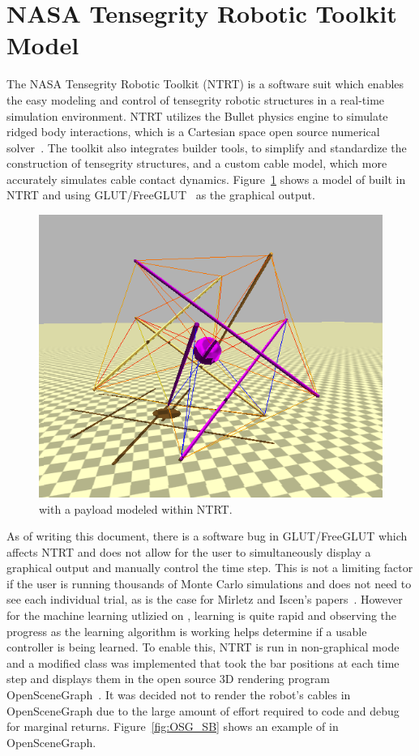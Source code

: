 \section{NASA Tensegrity Robotic Toolkit Model}
The NASA Tensegrity Robotic Toolkit (NTRT) is a software suit which enables the easy modeling and control of tensegrity robotic structures in a real-time simulation environment.
NTRT utilizes the Bullet physics engine to simulate ridged body interactions, which is a Cartesian space open source numerical solver~\cite{coumans2012bullet}.
The toolkit also integrates builder tools, to simplify and standardize the construction of tensegrity structures, and a custom cable model, which more accurately simulates cable contact dynamics.
Figure~\ref{fig:NTRT_SB} shows a model of \SB{} built in NTRT and using GLUT/FreeGLUT~\cite{baker2008freeglut} as the graphical output.

\begin{figure}[th]
      \centering
      \includegraphics[width=0.8\columnwidth]{tex/img/1.png}
      \caption{\SB{} with a payload modeled within NTRT.}
      \label{fig:NTRT_SB}
\end{figure}

As of writing this document, there is a software bug in GLUT/FreeGLUT which affects NTRT and does not allow for the user to simultaneously display a graphical output and manually control the time step.
This is not a limiting factor if the user is running thousands of Monte Carlo simulations and does not need to see each individual trial, as is the case for Mirletz and Iscen's papers~\cite{mirletz2015goal, iscen2014flop}.
However for the machine learning utlizied on \SB{}, learning is quite rapid and observing the progress as the learning algorithm is working helps determine if a usable controller is being learned.
To enable this, NTRT is run in non-graphical mode and a modified class was implemented that took the bar positions at each time step and displays them in the open source 3D rendering program OpenSceneGraph~\cite{osfield2004open}.
It was decided not to render the robot's cables in OpenSceneGraph due to the large amount of effort required to code and debug for marginal returns.
Figure~\ref{fig:OSG_SB} shows an example of \SB{} in OpenSceneGraph.

